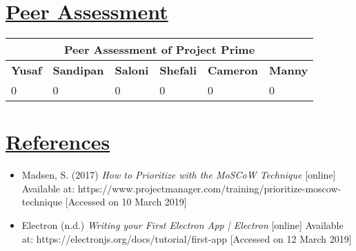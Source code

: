 \documentclass{article}
\begin{document}
\section{\underline{Peer Assessment}}
\begin{tabular}{|p{2cm}|p{2cm}|p{2cm}|p{2cm}|p{2cm}|p{2cm}|}
\hline
\multicolumn{6}{|c|}{\textbf{Peer Assessment of Project Prime}} \\
\hline
\textbf{Yusaf} & \textbf{Sandipan} & \textbf{Saloni} & \textbf{Shefali} & \textbf{Cameron} & \textbf{Manny} \\
\hline
0 & 0 & 0 & 0 & 0 & 0 \\
\hline
\end{tabular}
	
\section{\underline{References}}
\begin{itemize}
\item Madsen, S. (2017) \textit{How to Prioritize with the MoSCoW Technique} [online] Available at: https://www.projectmanager.com/training/prioritize-moscow-technique [Accessed on 10 March 2019]
\item Electron (n.d.) \textit{Writing your First Electron App | Electron} [online] Available at: https://electronjs.org/docs/tutorial/first-app [Accessed on 12 March 2019]
\end{itemize}
\end{document}
